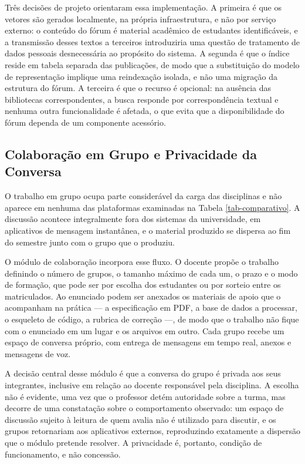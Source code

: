 Três decisões de projeto orientaram essa implementação. A primeira é que os
vetores são gerados localmente, na própria infraestrutura, e não por serviço
externo: o conteúdo do fórum é material acadêmico de estudantes identificáveis,
e a transmissão desses textos a terceiros introduziria uma questão de
tratamento de dados pessoais desnecessária ao propósito do sistema. A segunda é
que o índice reside em tabela separada das publicações, de modo que a
substituição do modelo de representação implique uma reindexação isolada, e não
uma migração da estrutura do fórum. A terceira é que o recurso é opcional: na
ausência das bibliotecas correspondentes, a busca responde por correspondência
textual e nenhuma outra funcionalidade é afetada, o que evita que a
disponibilidade do fórum dependa de um componente acessório.

\subsection{Colaboração em Grupo e Privacidade da Conversa}
\label{colaboracao}

O trabalho em grupo ocupa parte considerável da carga das disciplinas e não
aparece em nenhuma das plataformas examinadas na Tabela \ref{tab-comparativo}.
A discussão acontece integralmente fora dos sistemas da universidade, em
aplicativos de mensagem instantânea, e o material produzido se dispersa ao fim
do semestre junto com o grupo que o produziu.

O módulo de colaboração incorpora esse fluxo. O docente propõe o trabalho
definindo o número de grupos, o tamanho máximo de cada um, o prazo e o modo de
formação, que pode ser por escolha dos estudantes ou por sorteio entre os
matriculados. Ao enunciado podem ser anexados os materiais de apoio que o
acompanham na prática --- a especificação em PDF, a base de dados a processar,
o esqueleto de código, a rubrica de correção ---, de modo que o trabalho não
fique com o enunciado em um lugar e os arquivos em outro. Cada grupo recebe um
espaço de conversa próprio, com entrega de mensagens em tempo real, anexos e
mensagens de voz.

A decisão central desse módulo é que a conversa do grupo é privada aos seus
integrantes, inclusive em relação ao docente responsável pela disciplina. A
escolha não é evidente, uma vez que o professor detém autoridade sobre a
turma, mas decorre de uma constatação sobre o comportamento observado: um
espaço de discussão sujeito à leitura de quem avalia não é utilizado para
discutir, e os grupos retornariam aos aplicativos externos, reproduzindo
exatamente a dispersão que o módulo pretende resolver. A privacidade é,
portanto, condição de funcionamento, e não concessão.

